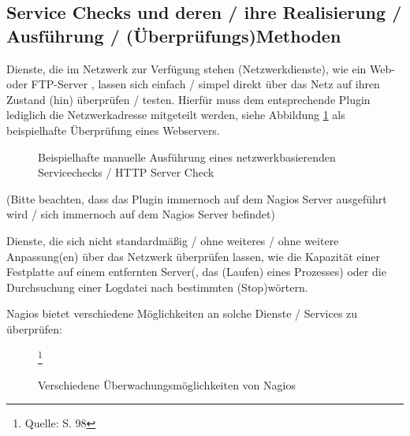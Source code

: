 \subsection{Service Checks und deren / ihre Realisierung / Ausführung / (Überprüfungs)Methoden}

Dienste, die im Netzwerk zur Verfügung stehen (Netzwerkdienste), wie ein Web- oder \gls{FTP}-Server , lassen sich einfach / simpel direkt über das Netz auf ihren Zustand (hin) überprüfen /  testen.
Hierfür muss dem entsprechende Plugin lediglich die Netzwerkadresse mitgeteilt werden, siehe Abbildung \ref{check-http} als beispielhafte Überprüfung eines Webservers.

\begin{figure}[ht]  
	\centering
		\caption{Beispielhafte manuelle Ausführung eines netzwerkbasierenden Servicechecks / HTTP Server Check}
		\label{check-http}
\end{figure}

(Bitte beachten, dass das Plugin immernoch auf dem Nagios Server ausgeführt wird / sich immernoch auf dem Nagios Server befindet)

Dienste, die sich nicht standardmäßig / ohne weiteres / ohne weitere Anpassung(en) über das Netzwerk überprüfen lassen, wie die Kapazität einer Festplatte auf einem entfernten Server(, das (Laufen) eines Prozesses) oder die Durchsuchung einer Logdatei nach bestimmten (Stop)wörtern.

Nagios bietet verschiedene Möglichkeiten an solche Dienste /  Services zu überprüfen:

\begin{figure}[ht]
	\centering
		\caption{Verschiedene Überwachungsmöglichkeiten von Nagios}\footnote{Quelle: \cite{Barth08} S. 98}
		\label{nagios-kern}
\end{figure} 

